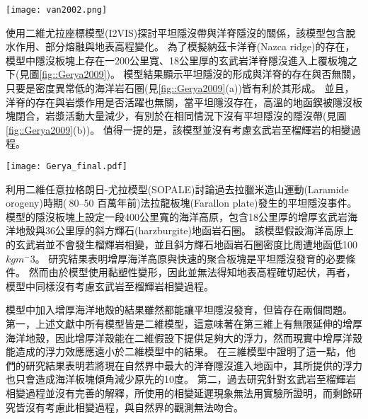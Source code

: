 \begin{figure*}[ht!]
    \centering
    \texttt{[image: van2002.png]}
    \caption{正常的隱沒帶(左)與包含海洋高原的隱沒帶(右)隨模型時間變化，摘自\citealp{van2002role}。黑白區域繪出海洋地殼的化學成分從玄武岩(黑)到榴輝岩(白)的變化。水平軸為與海溝的距離，背景顏色為溫度。
    }
    \label{fig::van2002}
\end{figure*}

\citealp{Gerya2009}使用二維尤拉座標模型(I2VIS)探討平坦隱沒帶與洋脊隱沒的關係，該模型包含脫水作用、部分熔融與地表高程變化。
為了模擬納茲卡洋脊(Nazca ridge)的存在，模型中隱沒板塊上存在一200公里寬、18公里厚的玄武岩洋脊隱沒進入上覆板塊之下(見圖\ref{fig::Gerya2009})。
模型結果顯示平坦隱沒的形成與洋脊的存在與否無關，只要是密度異常低的海洋岩石圈(見\ref{fig::Gerya2009}(a))皆有利於其形成。
並且，洋脊的存在與岩漿作用是否活躍也無關，當平坦隱沒存在，高溫的地函鍥被隱沒板塊閉合，岩漿活動大量減少，有別於在相同情況下沒有平坦隱沒的隱沒帶(見圖\ref{fig::Gerya2009}(b))。
值得一提的是，該模型並沒有考慮玄武岩至榴輝岩的相變過程。

\begin{figure*}[ht!]
    \centering
    \texttt{[image: Gerya\_final.pdf]}
    \caption{\citealp{Gerya2009}中模型於第12個百萬年的結果。圖組(a)與圖組(b)分別為隱沒海洋地函岩石圈密度$3100 kgm^{-3}$與$3300 kgm^{-3}$的結果。(a)上圖與(b)上圖為包含洋脊隱沒的模型，(a)(b)下圖為不包含洋脊的模型，圖中白線為等溫線。其中，顏色代表不同岩相：1、2=大陸地殼、3、4=沈積物、5、6=玄武岩、7、8=輝長岩、9、10=無水地函、11=蛇紋岩、12、13、14=含水地函。
    }
    \label{fig::Gerya2009}
\end{figure*}

\citealp{Liu2016}利用二維任意拉格朗日-尤拉模型(SOPALE)討論過去拉臘米造山運動(Laramide orogeny)時期($~$80–50 百萬年前)法拉龍板塊(Farallon plate)發生的平坦隱沒事件。
模型的隱沒板塊上設定一段400公里寬的海洋高原，包含18公里厚的增厚玄武岩海洋地殼與36公里厚的斜方輝石(harzburgite)地函岩石圈。
該模型假設海洋高原上的玄武岩並不會發生榴輝岩相變，並且斜方輝石地函岩石圈密度比周遭地函低100 $kg m^-3$。
研究結果表明增厚海洋高原與快速的聚合板塊是平坦隱沒發育的必要條件。
然而由於模型使用黏塑性變形，因此並無法得知地表高程確切起伏，再者，模型中同樣沒有考慮玄武岩至榴輝岩相變過程。

模型中加入增厚海洋地殼的結果雖然都能讓平坦隱沒發育，但皆存在兩個問題。
第一，上述文獻中所有模型皆是二維模型，這意味著在第三維上有無限延伸的增厚海洋地殼，因此增厚洋殼能在二維假設下提供足夠大的浮力，然而現實中增厚洋殼能造成的浮力效應應遠小於二維模型中的結果。
\citealp{florez2019impact}在三維模型中證明了這一點，他們的研究結果表明若將現在自然界中最大的洋脊隱沒進入地函中，其所提供的浮力也只會造成海洋板塊傾角減少原先的10度。
第二，過去研究針對玄武岩至榴輝岩相變過程並沒有完善的解釋，\citealp{van2002role}所使用的相變延遲現象無法用實驗所證明，而剩餘研究皆沒有考慮此相變過程，與自然界的觀測無法吻合。

